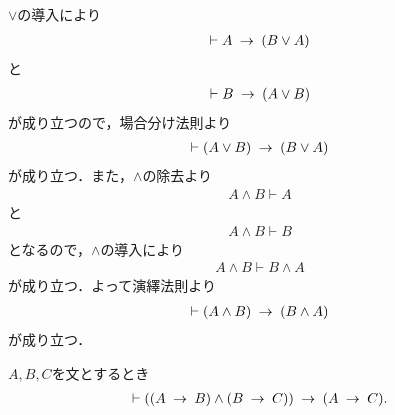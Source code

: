 	\begin{prf}
		$\vee$の導入により
		\begin{align}
			\vdash A \hspace{0.25em}\rightarrow\hspace{0.25em} (B \vee A)
		\end{align}
		と
		\begin{align}
			\vdash B \hspace{0.25em}\rightarrow\hspace{0.25em} (A \vee B)
		\end{align}
		が成り立つので，場合分け法則より
		\begin{align}
			\vdash (A \vee B) \hspace{0.25em}\rightarrow\hspace{0.25em} (B \vee A)
		\end{align}
		が成り立つ．また，$\wedge$の除去より
		\begin{align}
			A \wedge B \vdash A
		\end{align}
		と
		\begin{align}
			A \wedge B \vdash B
		\end{align}
		となるので，$\wedge$の導入により
		\begin{align}
			A \wedge B \vdash B \wedge A
		\end{align}
		が成り立つ．よって演繹法則より
		\begin{align}
			\vdash (A \wedge B) \hspace{0.25em}\rightarrow\hspace{0.25em} (B \wedge A)
		\end{align}
		が成り立つ．
		\QED
	\end{prf}
	
	\begin{screen}
		\begin{logicalthm}[含意の推移律]\label{logicalthm:transitive_law_of_implication}
			$A,B,C$を文とするとき
			\begin{align}
				\vdash ((A \hspace{0.25em}\rightarrow\hspace{0.25em} B) \wedge (B \hspace{0.25em}\rightarrow\hspace{0.25em} C)) 
				\hspace{0.25em}\rightarrow\hspace{0.25em} (A \hspace{0.25em}\rightarrow\hspace{0.25em} C).
			\end{align}
		\end{logicalthm}
	\end{screen}
	
